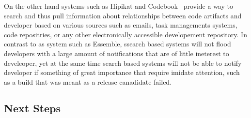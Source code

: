 On the other hand systems such as Hipikat\cite{} and Codebook~\cite{} provide a way to search and thus pull information about relationships between code artifacts and developer based on various sources such as emails, task managements systems, code repositries, or any other electronically accessible developement repository.
In contrast to as system such as Essemble, ssearch based systems will not flood developers with a large amount of notifications that are of little ineterest to develeoper, yet at the same time search based systems will not be able to notify developer if something of great importance that require imidate attention, such as a build that was meant as a release canadidate failed.

\subsection{Next Steps}
